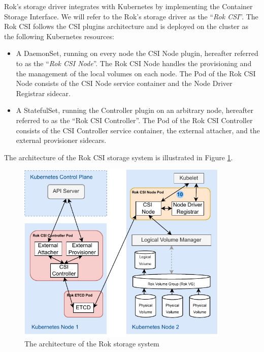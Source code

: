 Rok's storage driver integrates with Kubernetes by implementing the Container
Storage Interface. We will refer to the Rok's storage driver as the
``\textit{Rok CSI}''. The Rok CSI follows the CSI plugins architecture and is
deployed on the cluster as the following Kubernetes resources:
\begin{itemize}
    \item A DaemonSet, running on every node the CSI Node plugin, hereafter
    referred to as the ``\textit{Rok CSI Node}''. The Rok CSI Node handles the
    provisioning and the management of the local volumes on each node. The Pod
    of the Rok CSI Node consists of the CSI Node service container and the Node
    Driver Registrar sidecar.
    \item A StatefulSet, running the Controller plugin on an arbitrary node,
    hereafter referred to as the ``Rok CSI Controller''. The Pod of the Rok CSI
    Controller consists of the CSI Controller service container, the external
    attacher, and the external provisioner sidecars.
\end{itemize}

The architecture of the Rok CSI storage system is illustrated in Figure
\ref{figure:rok-csi-architecture}.

\begin{figure}[ht]
  \centering
  \includegraphics[width=0.9\textwidth]{resources/rok-csi-architecture.pdf}
  \caption{The architecture of the Rok storage system}
  \label{figure:rok-csi-architecture}
\end{figure}